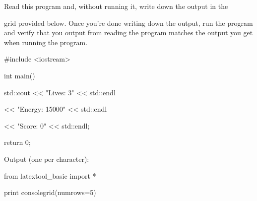 Read this program and, without running it, write down the output in the 

grid provided below. Once you're done writing down the output, run the program and verify that you output from reading the program matches the output you get when running the program.

\begin{console}

#include <iostream>



int main()

{

    std::cout << "Lives: 3" << std::endl

              << "Energy: 15000" << std::endl

              << "Score: 0" << std::endl;



    return 0;

}

\end{console}

Output (one per character):

\begin{python}

from latextool_basic import *

print consolegrid(numrows=5)

\end{python}

